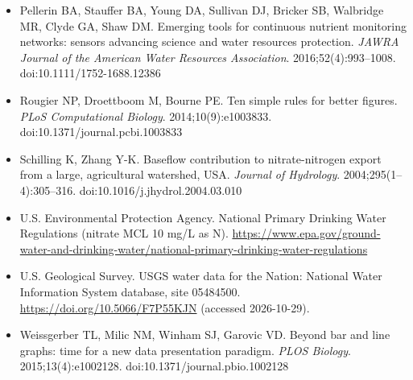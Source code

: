 \begin{itemize}
\item Pellerin BA, Stauffer BA, Young DA, Sullivan DJ, Bricker SB, Walbridge MR, Clyde GA, Shaw DM. Emerging tools for continuous nutrient monitoring networks: sensors advancing science and water resources protection. \textit{JAWRA Journal of the American Water Resources Association}. 2016;52(4):993--1008. doi:10.1111/1752-1688.12386
\item Rougier NP, Droettboom M, Bourne PE. Ten simple rules for better figures. \textit{PLoS Computational Biology}. 2014;10(9):e1003833. doi:10.1371/journal.pcbi.1003833
\item Schilling K, Zhang Y-K. Baseflow contribution to nitrate-nitrogen export from a large, agricultural watershed, USA. \textit{Journal of Hydrology}. 2004;295(1--4):305--316. doi:10.1016/j.jhydrol.2004.03.010
\item U.S. Environmental Protection Agency. National Primary Drinking Water Regulations (nitrate MCL 10 mg/L as N). \url{https://www.epa.gov/ground-water-and-drinking-water/national-primary-drinking-water-regulations}
\item U.S. Geological Survey. USGS water data for the Nation: National Water Information System database, site 05484500. \url{https://doi.org/10.5066/F7P55KJN} (accessed 2026-10-29).
\item Weissgerber TL, Milic NM, Winham SJ, Garovic VD. Beyond bar and line graphs: time for a new data presentation paradigm. \textit{PLOS Biology}. 2015;13(4):e1002128. doi:10.1371/journal.pbio.1002128
\end{itemize}
